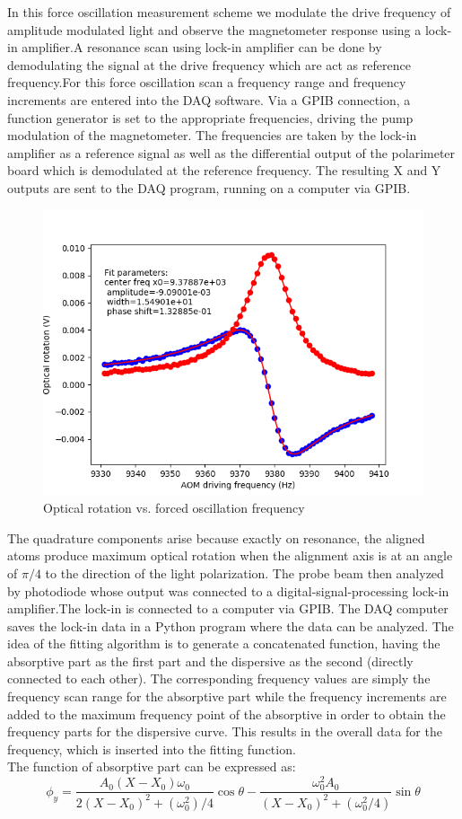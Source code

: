  In this force oscillation measurement scheme we modulate the drive frequency of amplitude modulated light and  observe the magnetometer response using a lock-in amplifier.A resonance scan using lock-in amplifier can be done by demodulating the signal at the drive frequency which are act as reference frequency.For this force oscillation scan a frequency range and frequency increments are entered into the DAQ software. Via a
GPIB connection, a function generator is set to the appropriate frequencies, driving
the pump modulation of the magnetometer. The frequencies are taken by the lock-in
amplifier as a reference signal as well as the differential output of the polarimeter board
which is demodulated at the reference frequency. The resulting X and Y outputs are sent to the DAQ program, running on a computer via GPIB. 
\begin{figure}[h]
\centering\includegraphics[width=0.4\linewidth]{figures/FM_NMOR}
\caption{Optical rotation vs. forced oscillation frequency}
\end{figure}
The quadrature components arise because exactly on resonance, the aligned atoms produce maximum optical rotation when the alignment axis is at an angle of $ \pi/4$   to the direction of the light polarization.  
The probe beam then analyzed by photodiode whose output was connected to a digital-signal-processing lock-in amplifier.The lock-in is connected to a computer via GPIB. The DAQ computer saves the lock-in data in  a Python program where the data can be analyzed. The idea of the fitting algorithm is to generate a concatenated function, having the absorptive part as the first part and the dispersive as the second (directly connected to each other). The corresponding frequency values are simply the frequency scan range for the absorptive part while the frequency increments are added to the maximum frequency point of the absorptive in order to obtain the frequency parts for the dispersive curve. This results in
the overall data for the frequency, which is inserted into the fitting function.\\
The function of absorptive part can be expressed as:
\begin{equation}
\phi_y= \frac{A_0 (X-X_0 )\omega_0}{2(X-X_0 )^2+(\omega_0^2)/4}\cos\theta-\frac{\omega_0^2A_0}{(X-X_0 )^2+(\omega_0^2/4)}\sin\theta
\end{equation}
